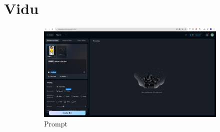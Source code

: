 \FloatBarrier
\section{Vidu}
\label{s.viduApendice}

\begin{figure}[htbp]
    \centering
    \caption{\small Processo da utilização do Vidu em junho/2025}
    \label{fig:vidu1}
    \begin{subfigure}{0.75\linewidth}
        \includegraphics[width=1\linewidth]{figs/vidu/tela.PNG}
        \caption{\small Prompt}
        \label{fig:vidu1a}
    \end{subfigure}
    \begin{subfigure}{0.2\linewidth}

\end{subfigure}
\end{figure}
